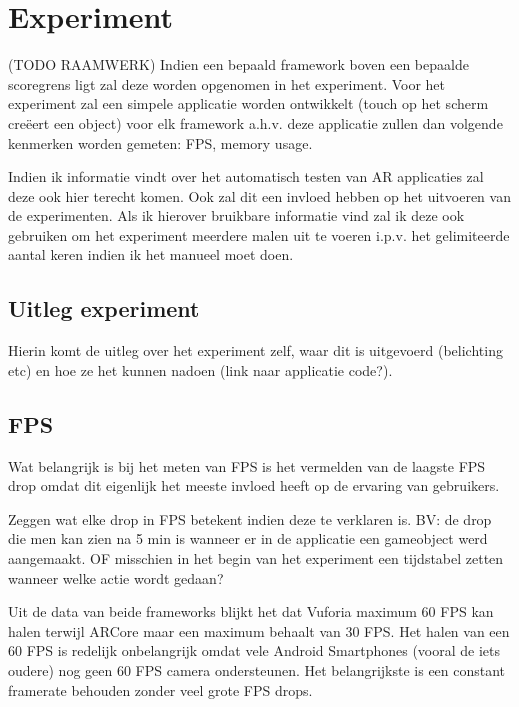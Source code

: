 \chapter{Experiment}
\label{ch:experiment}

(TODO RAAMWERK) Indien een bepaald framework boven een bepaalde scoregrens ligt zal deze worden opgenomen in het experiment.
Voor het experiment zal een simpele applicatie worden ontwikkelt (touch op het scherm creëert een object) voor elk framework a.h.v. deze applicatie zullen dan volgende kenmerken worden gemeten:  FPS, memory usage.

Indien ik informatie vindt over het automatisch testen van AR applicaties zal deze ook hier terecht komen. Ook zal dit een invloed hebben op het uitvoeren van de experimenten. Als ik hierover bruikbare informatie vind zal ik deze ook gebruiken om het experiment meerdere malen uit te voeren i.p.v. het gelimiteerde aantal keren indien ik het manueel moet doen.

\section{Uitleg experiment}
Hierin komt de uitleg over het experiment zelf, waar dit is uitgevoerd (belichting etc) en hoe ze het kunnen nadoen (link naar applicatie code?).

\section{FPS}
Wat belangrijk is bij het meten van FPS is het vermelden van de laagste FPS drop omdat dit eigenlijk het meeste invloed heeft op de ervaring van gebruikers.

Zeggen wat elke drop in FPS betekent indien deze te verklaren is. BV: de drop die men kan zien na 5 min is wanneer er in de applicatie een gameobject werd aangemaakt. OF misschien in het begin van het experiment een tijdstabel zetten wanneer welke actie wordt gedaan?

Uit de data van beide frameworks blijkt het dat Vuforia maximum 60 FPS kan halen terwijl ARCore maar een maximum behaalt van 30 FPS. Het halen van een 60 FPS is redelijk onbelangrijk omdat vele Android Smartphones (vooral de iets oudere) nog geen 60 FPS camera ondersteunen. Het belangrijkste is een constant framerate behouden zonder veel grote FPS drops.

